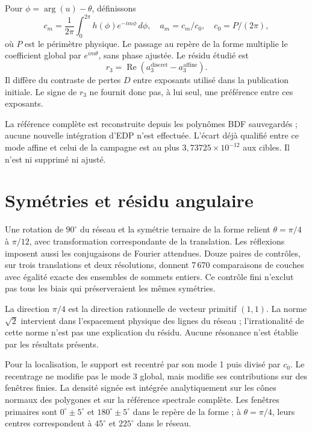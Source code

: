 \documentclass[11pt,a4paper]{article}
\newcommand{\Rea}{\operatorname{Re}}
\newcommand{\sci}[2]{#1\times10^{#2}}
\begin{document}
Pour $\phi=\arg(u)-\theta$, définissons
\begin{equation}
c_m=\frac1{2\pi}\int_0^{2\pi}h(\phi)e^{-im\phi}\,d\phi,
\quad a_m=c_m/c_0,\quad c_0=P/(2\pi),
\end{equation}
où $P$ est le périmètre physique. Le passage au repère de la forme multiplie le coefficient global par $e^{im\theta}$, sans phase ajustée. Le résidu étudié est
\begin{equation}
r_3=\Rea\!\left(a_3^{\mathrm{discret}}-a_3^{\mathrm{affine}}\right).
\end{equation}
Il diffère du contraste de pertes $D$ entre exposants utilisé dans la publication initiale. Le signe de $r_3$ ne fournit donc pas, à lui seul, une préférence entre ces exposants.

La référence complète est reconstruite depuis les polynômes BDF sauvegardés ; aucune nouvelle intégration d'EDP n'est effectuée. L'écart déjà qualifié entre ce mode affine et celui de la campagne est au plus $\sci{3{,}73725}{-12}$ aux cibles. Il n'est ni supprimé ni ajusté.

\newpage
\section{Symétries et résidu angulaire}
Une rotation de $90^\circ$ du réseau et la symétrie ternaire de la forme relient $\theta=\pi/4$ à $\pi/12$, avec transformation correspondante de la translation. Les réflexions imposent aussi les conjugaisons de Fourier attendues. Douze paires de contrôles, sur trois translations et deux résolutions, donnent 7\,670 comparaisons de couches avec égalité exacte des ensembles de sommets entiers. Ce contrôle fini n'exclut pas tous les biais qui préserveraient les mêmes symétries.

La direction $\pi/4$ est la direction rationnelle de vecteur primitif $(1,1)$. La norme $\sqrt2$ intervient dans l'espacement physique des lignes du réseau ; l'irrationalité de cette norme n'est pas une explication du résidu. Aucune résonance n'est établie par les résultats présents.

Pour la localisation, le support est recentré par son mode 1 puis divisé par $c_0$. Le recentrage ne modifie pas le mode 3 global, mais modifie ses contributions sur des fenêtres finies. La densité signée est intégrée analytiquement sur les cônes normaux des polygones et sur la référence spectrale complète. Les fenêtres primaires sont $0^\circ\pm5^\circ$ et $180^\circ\pm5^\circ$ dans le repère de la forme ; à $\theta=\pi/4$, leurs centres correspondent à $45^\circ$ et $225^\circ$ dans le réseau.
\end{document}
